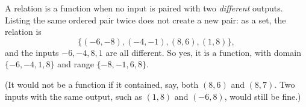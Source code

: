 A relation is a function when no input is paired with two \emph{different} outputs. Listing the same ordered pair twice does not create a new pair: as a set, the relation is
\[
\{(-6,-8),(-4,-1),(8,6),(1,8)\},
\]
and the inputs $-6,-4,8,1$ are all different. So $\boxed{\text{yes, it is a function}}$, with domain $\{-6,-4,1,8\}$ and range $\{-8,-1,6,8\}$.

(It would not be a function if it contained, say, both $(8,6)$ and $(8,7)$. Two inputs with the same output, such as $(1,8)$ and $(-6,8)$, would still be fine.)
